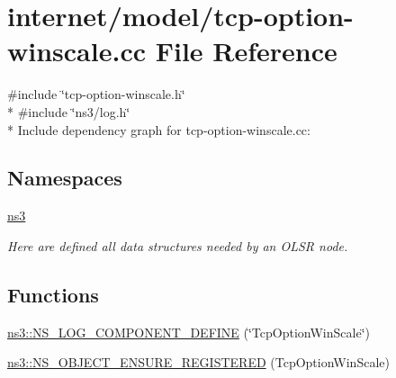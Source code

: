 \hypertarget{tcp-option-winscale_8cc}{}\section{internet/model/tcp-\/option-\/winscale.cc File Reference}
\label{tcp-option-winscale_8cc}
{\ttfamily \#include \char`\"{}tcp-\/option-\/winscale.\+h\char`\"{}}\\*
{\ttfamily \#include \char`\"{}ns3/log.\+h\char`\"{}}\\*
Include dependency graph for tcp-\/option-\/winscale.cc\+:
\subsection*{Namespaces}
\begin{DoxyCompactItemize}
\item 
 \hyperlink{namespacens3}{ns3}
\begin{DoxyCompactList}\small\item\em Here are defined all data structures needed by an O\+L\+SR node. \end{DoxyCompactList}\end{DoxyCompactItemize}
\subsection*{Functions}
\begin{DoxyCompactItemize}
\item 
\hyperlink{namespacens3_ac1da1b23686d213024d815474c216bfc}{ns3\+::\+N\+S\+\_\+\+L\+O\+G\+\_\+\+C\+O\+M\+P\+O\+N\+E\+N\+T\+\_\+\+D\+E\+F\+I\+NE} (\char`\"{}Tcp\+Option\+Win\+Scale\char`\"{})
\item 
\hyperlink{namespacens3_a003dd99524ebc10cb798f3915abaf7f8}{ns3\+::\+N\+S\+\_\+\+O\+B\+J\+E\+C\+T\+\_\+\+E\+N\+S\+U\+R\+E\+\_\+\+R\+E\+G\+I\+S\+T\+E\+R\+ED} (Tcp\+Option\+Win\+Scale)
\end{DoxyCompactItemize}
